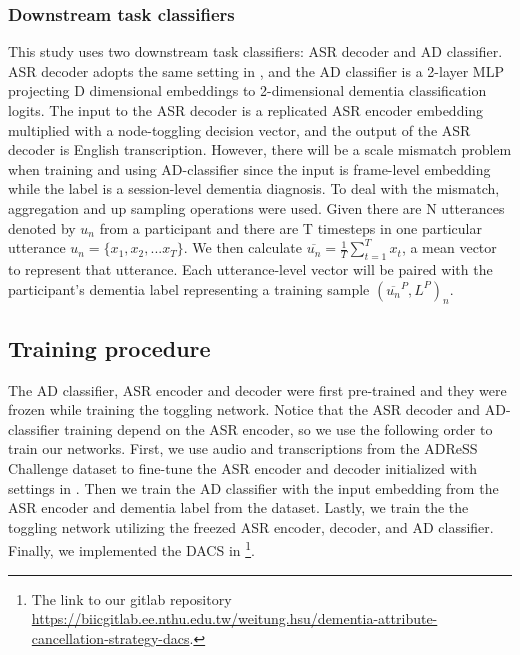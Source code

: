 \documentclass[lettersize,journal]{IEEEtran}
\begin{document}
\subsubsection{Downstream task classifiers}
This study uses two downstream task classifiers: ASR decoder and AD classifier. ASR decoder adopts the same setting in \cite{baevski2022data2vec}, and the AD classifier is a 2-layer MLP projecting D dimensional embeddings to 2-dimensional dementia classification logits. The input to the ASR decoder is a replicated ASR encoder embedding multiplied with a node-toggling decision vector, and the output of the ASR decoder is English transcription. However, there will be a scale mismatch problem when training and using AD-classifier since the input is frame-level embedding while the label is a session-level dementia diagnosis. To deal with the mismatch, aggregation and up sampling operations were used. Given there are N utterances denoted by $u_{n}$ from a participant and there are T timesteps in one particular utterance $u_{n} = \{x_{1},x_{2},...x_{T}\}$. We then calculate $\overline{u_{n}}=\frac{1}{T}\sum_{t=1}^{T}{x_{t}}$, a mean vector to represent that utterance. Each utterance-level vector will be paired with the participant's dementia label representing a training sample $(\overline{u_{n}}^{P}, L^{P})_{n}$.
\subsection{Training procedure}
The AD classifier, ASR encoder and decoder were first
pre-trained and they were frozen while training the toggling network. Notice that the ASR decoder and AD-classifier training depend on the ASR encoder, so we use the following order to train our networks. First, we use audio and transcriptions from the ADReSS Challenge dataset to fine-tune the ASR encoder and decoder initialized with settings in \cite{baevski2022data2vec}. Then we train the AD classifier with the input embedding from the ASR encoder and dementia label from the dataset. Lastly, we train the the toggling network utilizing the freezed ASR encoder, decoder, and AD classifier. Finally, we implemented the DACS in \footnote{The link to our gitlab repository \url{https://biicgitlab.ee.nthu.edu.tw/weitung.hsu/dementia-attribute-cancellation-strategy-dacs}.}.
\end{document}
